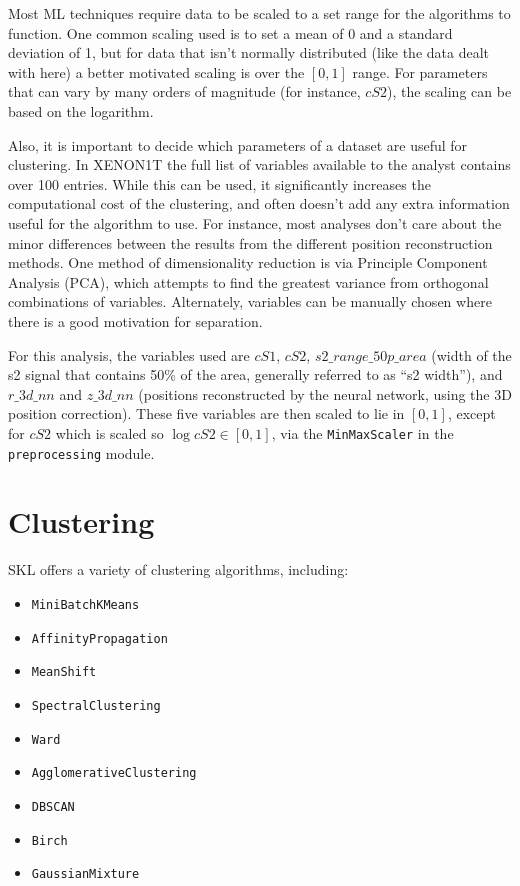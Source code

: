 Most ML techniques require data to be scaled to a set range for the algorithms to function. One common scaling used is to set a mean of 0 and a standard deviation of 1, but for data that isn't normally distributed (like the data dealt with here) a better motivated scaling is over the $[0,1]$ range. For parameters that can vary by many orders of magnitude (for instance, $cS2$), the scaling can be based on the logarithm.

Also, it is important to decide which parameters of a dataset are useful for clustering. In XENON1T the full list of variables available to the analyst contains over 100 entries. While this can be used, it significantly increases the computational cost of the clustering, and often doesn't add any extra information useful for the algorithm to use. For instance, most analyses don't care about the minor differences between the results from the different position reconstruction methods. One method of dimensionality reduction is via Principle Component Analysis (PCA), which attempts to find the greatest variance from orthogonal combinations of variables. Alternately, variables can be manually chosen where there is a good motivation for separation.

For this analysis, the variables used are $cS1$, $cS2$, $s2\_range\_50p\_area$ (width of the s2 signal that contains 50\% of the area, generally referred to as ``s2 width''), and $r\_3d\_nn$ and $z\_3d\_nn$ (positions reconstructed by the neural network, using the 3D position correction). These five variables are then scaled to lie in $[0,1]$, except for $cS2$ which is scaled so $\log cS2 \in [0,1]$, via the \texttt{MinMaxScaler} in the \texttt{preprocessing} module.

\section{Clustering}

SKL offers a variety of clustering algorithms, including:
\begin{itemize}
    \item \texttt{MiniBatchKMeans}
    \item \texttt{AffinityPropagation}
    \item \texttt{MeanShift}
    \item \texttt{SpectralClustering}
    \item \texttt{Ward}
    \item \texttt{AgglomerativeClustering}
    \item \texttt{DBSCAN}
    \item \texttt{Birch}
    \item \texttt{GaussianMixture}
\end{itemize}

